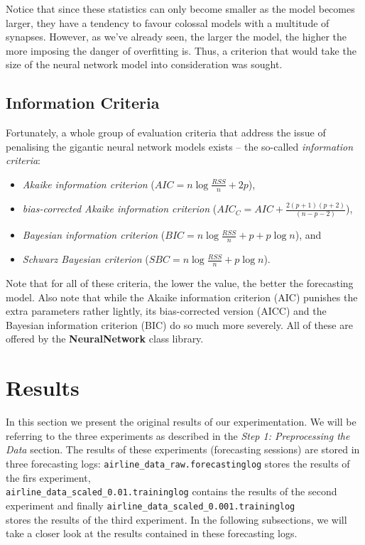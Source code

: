 Notice that since these statistics can only become smaller as the model becomes larger, they have a tendency to favour colossal models with a multitude of synapses. However, as we've already seen, the larger the model, the higher the more imposing the danger of overfitting is. Thus, a criterion that would take the size of the neural network model into consideration was sought.

\subsection{Information Criteria}

Fortunately, a whole group of evaluation criteria that address the issue of penalising the gigantic neural network models exists -- the so-called \textit{information criteria}:
\begin{itemize}
\item \textit{Akaike information criterion} ($ AIC = n \log{\frac{RSS}{n}} + 2p $),
\item \textit{bias-corrected Akaike information criterion} ($ AIC_C = AIC + \frac{2(p + 1)(p + 2)}{(n - p - 2)}$),
\item \textit{Bayesian information criterion} ($ BIC = n \log{\frac{RSS}{n}} + p + p \log{n} $), and
\item \textit{Schwarz Bayesian criterion} ($ SBC = n \log{\frac{RSS}{n}} + p \log{n}$).
\end{itemize}

Note that for all of these criteria, the lower the value, the better the forecasting model. Also note that while the Akaike information criterion (AIC) punishes the extra parameters rather lightly, its bias-corrected version (AICC) and the Bayesian information criterion (BIC) do so much more severely. All of these are offered by the \textbf{NeuralNetwork} class library.

\section{Results}

In this section we present the original results of our experimentation. We will be referring to the three experiments as described in the \textit{Step 1: Preprocessing the Data} section. The results of these experiments (forecasting sessions) are stored in three forecasting logs: \texttt{airline\_data\_raw.forecastinglog} stores the results of the firs experiment,\\
\texttt{airline\_data\_scaled\_0.01.traininglog} contains the results of the second experiment and finally \texttt{airline\_data\_scaled\_0.001.traininglog}\\
stores the results of the third experiment. In the following subsections, we will take a closer look at the results contained in these forecasting logs.


